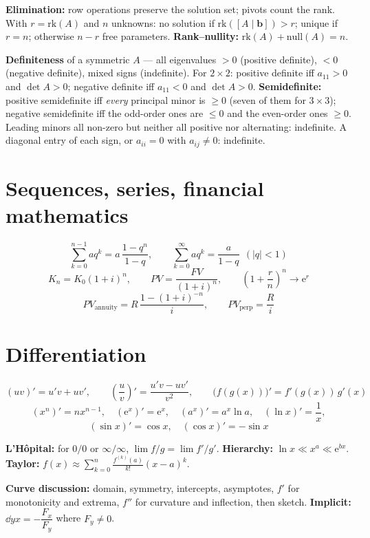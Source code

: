\textbf{Elimination:} row operations preserve the solution set; pivots
count the rank. With $r=\mathrm{rk}(A)$ and $n$ unknowns: no solution if
$\mathrm{rk}([A\mid\mathbf{b}])>r$; unique if $r=n$; otherwise $n-r$ free
parameters. \textbf{Rank--nullity:} $\mathrm{rk}(A)+\mathrm{null}(A)=n$.

\textbf{Definiteness} of a symmetric $A$ --- all eigenvalues $>0$
(positive definite), $<0$ (negative definite), mixed signs (indefinite).
For $2\times2$: positive definite iff $a_{11}>0$ and $\det A>0$; negative
definite iff $a_{11}<0$ and $\det A>0$.
\textbf{Semidefinite:} positive semidefinite iff \emph{every} principal
minor is $\ge0$ (seven of them for $3\times3$); negative semidefinite iff
the odd-order ones are $\le0$ and the even-order ones $\ge0$. Leading
minors all non-zero but neither all positive nor alternating: indefinite.
A diagonal entry of each sign, or $a_{ii}=0$ with $a_{ij}\neq0$:
indefinite.

\section*{Sequences, series, financial mathematics}

\[
  \sum_{k=0}^{n-1}aq^{k}=a\,\frac{1-q^{n}}{1-q},\qquad
  \sum_{k=0}^{\infty}aq^{k}=\frac{a}{1-q}\ \ (|q|<1)
\]
\[
  K_{n}=K_{0}(1+i)^{n},\qquad
  PV=\frac{FV}{(1+i)^{n}},\qquad
  \left(1+\frac{r}{n}\right)^{n}\to\mathrm{e}^{r}
\]
\[
  PV_{\text{annuity}}=R\,\frac{1-(1+i)^{-n}}{i},\qquad
  PV_{\text{perp}}=\frac{R}{i}
\]

\section*{Differentiation}

\[
  (uv)'=u'v+uv',\qquad
  \left(\frac{u}{v}\right)'=\frac{u'v-uv'}{v^{2}},\qquad
  \bigl(f(g(x))\bigr)'=f'(g(x))\,g'(x)
\]
\[
  (x^{n})'=nx^{n-1},\quad
  (\mathrm{e}^{x})'=\mathrm{e}^{x},\quad
  (a^{x})'=a^{x}\ln a,\quad
  (\ln x)'=\frac1x,
\]
\[
  (\sin x)'=\cos x,\quad
  (\cos x)'=-\sin x
\]

\textbf{L'H\^opital:} for $0/0$ or $\infty/\infty$,
$\lim f/g=\lim f'/g'$. \textbf{Hierarchy:}
$\ln x\ll x^{a}\ll\mathrm{e}^{bx}$. \textbf{Taylor:}
$f(x)\approx\sum_{k=0}^{n}\frac{f^{(k)}(a)}{k!}(x-a)^{k}$.

\textbf{Curve discussion:} domain, symmetry, intercepts, asymptotes,
$f'$ for monotonicity and extrema, $f''$ for curvature and inflection,
then sketch. \textbf{Implicit:}
$\dd{y}{x}=-\dfrac{F_{x}}{F_{y}}$ where $F_{y}\neq0$.

